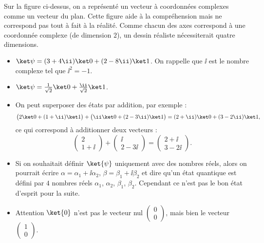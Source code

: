 \documentclass[11pt,class=report,crop=false]{standalone}
\begin{document}
Sur la figure ci-dessus, on a représenté un vecteur à coordonnées complexes comme un vecteur du plan. Cette figure aide à la compréhension mais ne correspond pas tout à fait à la réalité. Comme chacun des axes correspond à une coordonnée complexe (de dimension $2$), un dessin réaliste nécessiterait quatre dimensions. 

\bigskip

\begin{exemple}
\sauteligne
\begin{itemize}
  \item $\ket\psi = (3+4\ii)\ket0 + (2-8\ii)\ket1$. On rappelle que $\ii$ est le nombre complexe tel que $\ii^2=-1$.
  

  
  \item $\ket\psi = \frac{1}{\sqrt2} \ket0 + \frac{\ii}{\sqrt2}\ket1$.
  

  
  \item On peut superposer des états par addition, par exemple :
  $$\big( 2\ket0+(1+\ii)\ket1\big) + \big( \ii\ket0+(2-3\ii)\ket1\big)
  = (2+\ii)\ket0+(3-2\ii)\ket1,$$
  ce qui correspond à additionner deux vecteurs :
  $$\begin{pmatrix}2\\1+\ii\end{pmatrix}+ \begin{pmatrix}\ii\\2-3\ii\end{pmatrix}
  =\begin{pmatrix}2+\ii\\3-2\ii\end{pmatrix}.$$
\end{itemize}

\end{exemple}


\begin{remarque*}
\sauteligne
\begin{itemize}
  \item Si on souhaitait définir $\ket{\psi}$ uniquement avec des nombres réels, alors on pourrait écrire $\alpha = \alpha_1+\ii \alpha_2$, $\beta = \beta_1+\ii \beta_2$ et dire qu'un état quantique est défini par $4$ nombres réels $\alpha_1$, $\alpha_2$, $\beta_1$, $\beta_2$. Cependant ce n'est pas le bon état d'esprit pour la suite.
  
  \item Attention $\ket{0}$ n'est pas le vecteur nul $\left(\begin{smallmatrix}0\\0\end{smallmatrix}\right)$, mais bien le vecteur 
  $\left(\begin{smallmatrix}1\\0\end{smallmatrix}\right)$.
  
\end{itemize}
\end{remarque*}
\end{document}
